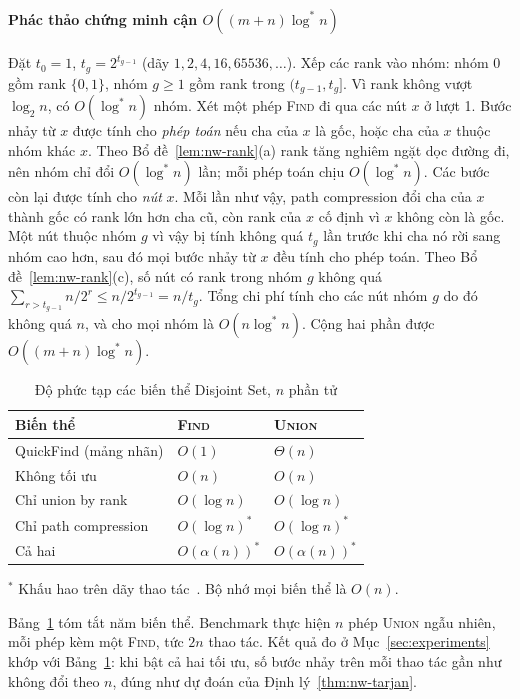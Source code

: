 \paragraph*{Phác thảo chứng minh cận $O((m+n)\log^* n)$} Đặt $t_0 = 1$, $t_g = 2^{t_{g-1}}$ (dãy $1, 2, 4, 16, 65536, \dots$). Xếp các rank vào nhóm: nhóm 0 gồm rank $\{0,1\}$, nhóm $g \ge 1$ gồm rank trong $(t_{g-1}, t_g]$. Vì rank không vượt $\log_2 n$, có $O(\log^* n)$ nhóm. Xét một phép \textsc{Find} đi qua các nút $x$ ở lượt 1. Bước nhảy từ $x$ được tính cho \emph{phép toán} nếu cha của $x$ là gốc, hoặc cha của $x$ thuộc nhóm khác $x$. Theo Bổ đề~\ref{lem:nw-rank}(a) rank tăng nghiêm ngặt dọc đường đi, nên nhóm chỉ đổi $O(\log^* n)$ lần; mỗi phép toán chịu $O(\log^* n)$. Các bước còn lại được tính cho \emph{nút} $x$. Mỗi lần như vậy, path compression đổi cha của $x$ thành gốc có rank lớn hơn cha cũ, còn rank của $x$ cố định vì $x$ không còn là gốc. Một nút thuộc nhóm $g$ vì vậy bị tính không quá $t_g$ lần trước khi cha nó rời sang nhóm cao hơn, sau đó mọi bước nhảy từ $x$ đều tính cho phép toán. Theo Bổ đề~\ref{lem:nw-rank}(c), số nút có rank trong nhóm $g$ không quá $\sum_{r > t_{g-1}} n/2^r \le n/2^{t_{g-1}} = n/t_g$. Tổng chi phí tính cho các nút nhóm $g$ do đó không quá $n$, và cho mọi nhóm là $O(n\log^* n)$. Cộng hai phần được $O((m+n)\log^* n)$.

\begin{table}[t]
\caption{Độ phức tạp các biến thể Disjoint Set, $n$ phần tử}
\label{tab:nw-dsu}
\centering
\begin{tabular}{@{}lll@{}}
\toprule
Biến thể & \textsc{Find} & \textsc{Union} \\
\midrule
QuickFind (mảng nhãn) & $O(1)$ & $\Theta(n)$ \\
Không tối ưu & $O(n)$ & $O(n)$ \\
Chỉ union by rank & $O(\log n)$ & $O(\log n)$ \\
Chỉ path compression & $O(\log n)^{*}$ & $O(\log n)^{*}$ \\
Cả hai & $O(\alpha(n))^{*}$ & $O(\alpha(n))^{*}$ \\
\bottomrule
\end{tabular}

\smallskip
{\footnotesize $^{*}$ Khấu hao trên dãy thao tác~\cite{clrs2022,tarjan1975}. Bộ nhớ mọi biến thể là $O(n)$.}
\end{table}

Bảng~\ref{tab:nw-dsu} tóm tắt năm biến thể. Benchmark thực hiện $n$ phép \textsc{Union} ngẫu nhiên, mỗi phép kèm một \textsc{Find}, tức $2n$ thao tác. Kết quả đo ở Mục~\ref{sec:experiments} khớp với Bảng~\ref{tab:nw-dsu}: khi bật cả hai tối ưu, số bước nhảy trên mỗi thao tác gần như không đổi theo $n$, đúng như dự đoán của Định lý~\ref{thm:nw-tarjan}.

